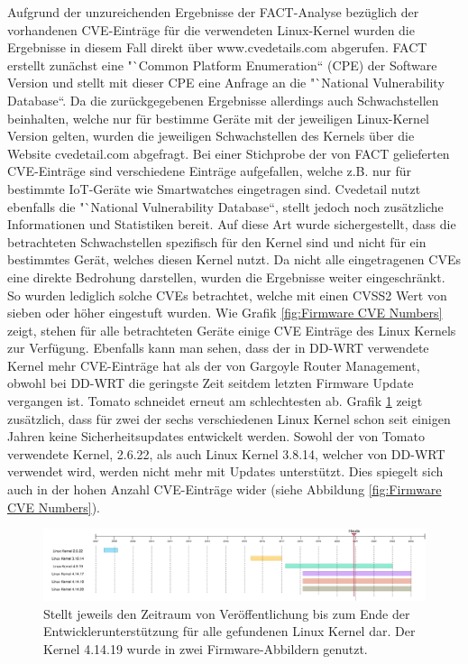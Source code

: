 \documentclass[a4paper]{book}
\begin{document}
\begin{large}
\begin{onehalfspace}
Aufgrund der unzureichenden Ergebnisse der FACT-Analyse bezüglich der vorhandenen CVE-Einträge für die verwendeten Linux-Kernel wurden die Ergebnisse in diesem Fall direkt über \glqq www.cvedetails.com\grqq{} abgerufen. FACT erstellt zunächst eine "`Common Platform Enumeration“ (CPE) der Software Version und stellt mit dieser CPE eine Anfrage an die "`National Vulnerability Database“. Da die zurückgegebenen Ergebnisse allerdings auch Schwachstellen beinhalten, welche nur für bestimme Geräte mit der jeweiligen Linux-Kernel Version gelten, wurden die jeweiligen Schwachstellen des Kernels über die \mbox Website \glqq cvedetail.com\grqq{} abgefragt. Bei einer Stichprobe der von FACT gelieferten CVE-Einträge sind verschiedene Einträge aufgefallen, welche z.B. nur für bestimmte IoT-Geräte wie Smartwatches eingetragen sind. Cvedetail nutzt ebenfalls die "`National Vulnerability Database“, stellt jedoch noch zusätzliche Informationen und  Statistiken bereit. Auf diese Art wurde \mbox sichergestellt, dass die betrachteten Schwachstellen spezifisch für den Kernel sind und nicht für ein bestimmtes Gerät, welches diesen Kernel nutzt. Da nicht alle eingetragenen CVEs eine direkte Bedrohung darstellen, wurden die Ergebnisse weiter eingeschränkt. So wurden lediglich solche CVEs betrachtet, welche mit einen CVSS2 Wert von sieben oder höher eingestuft wurden. Wie Grafik \ref{fig:Firmware CVE Numbers} zeigt, stehen für alle betrachteten Geräte einige CVE Einträge des Linux Kernels zur Verfügung. Ebenfalls kann man sehen, dass der in DD-WRT verwendete Kernel mehr CVE-Einträge hat als der von Gargoyle Router Management, obwohl bei DD-WRT die geringste Zeit seitdem letzten Firmware Update vergangen ist. Tomato schneidet erneut am schlechtesten ab. Grafik \ref{fig:Linux Kernel Timeline} zeigt zusätzlich, dass für zwei der sechs verschiedenen Linux Kernel schon seit einigen Jahren keine Sicherheitsupdates entwickelt werden. Sowohl der von Tomato verwendete Kernel, 2.6.22, als auch Linux Kernel 3.8.14, welcher von DD-WRT verwendet wird, werden nicht mehr mit Updates unterstützt. Dies spiegelt sich auch in der hohen Anzahl CVE-Einträge wider (siehe Abbildung \ref{fig:Firmware CVE Numbers}).

\begin{figure}[ht]
\begin{center}
\includegraphics[scale=0.3]{images/Timeline-Linux-Kernel} 
\caption{Stellt jeweils den Zeitraum von Veröffentlichung bis zum Ende der Entwicklerunterstützung für alle gefundenen Linux Kernel dar. Der Kernel 4.14.19 wurde in zwei Firmware-Abbildern genutzt.}
\label{fig:Linux Kernel Timeline}
\end{center}
\end{figure}



\end{onehalfspace}
\end{large}
\end{document}
